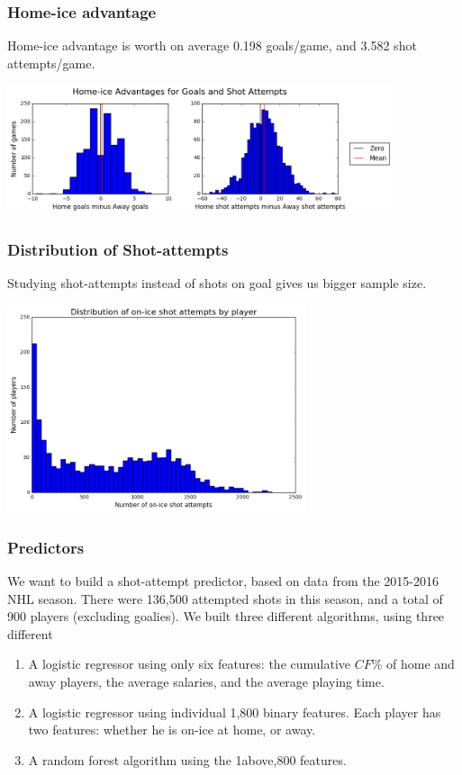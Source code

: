\documentclass{beamer}
\begin{document}
\begin{frame}
          \frametitle{Home-ice advantage}

Home-ice advantage is worth on average 0.198 goals/game, and 3.582 shot attempts/game.\\
\vspace{0.2in}

        \includegraphics[height=1.5in]{home_ice.png}


\end{frame}


\begin{frame}
          \frametitle{Distribution of Shot-attempts}
          
Studying shot-attempts instead of shots on goal gives us bigger sample size.
          
        \includegraphics[height=2.4in]{shot_dist.png}

\end{frame}


\begin{frame}
          \frametitle{Predictors}

	We want to build a shot-attempt predictor, based on data from the 2015-2016 NHL season. There were 136,500 attempted shots in this season, and a total of 900 players (excluding goalies). We built three different algorithms, using three different 
	
	\begin{enumerate}
	\item A logistic regressor using only six features: the cumulative $CF\%$ of home and away players, the average salaries, and the average playing time.
	\item A logistic regressor using individual 1,800 binary features. Each player has two features: whether he is on-ice at home, or away. 
	\item A random forest algorithm using the 1above,800 features.
	\end{enumerate}

\end{frame}
\end{document}
